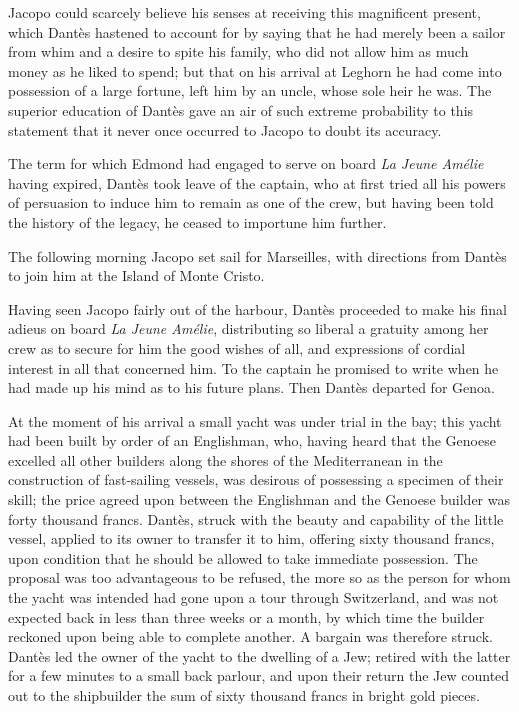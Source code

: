  Jacopo could scarcely believe his senses at receiving this magnificent present, which Dantès hastened to account for by saying that he had merely been a sailor from whim and a desire to spite his family, who did not allow him as much money as he liked to spend; but that on his arrival at Leghorn he had come into possession of a large fortune, left him by an uncle, whose sole heir he was. The superior education of Dantès gave an air of such extreme probability to this statement that it never once occurred to Jacopo to doubt its accuracy. 

 The term for which Edmond had engaged to serve on board \textit{La Jeune Amélie} having expired, Dantès took leave of the captain, who at first tried all his powers of persuasion to induce him to remain as one of the crew, but having been told the history of the legacy, he ceased to importune him further. 

 The following morning Jacopo set sail for Marseilles, with directions from Dantès to join him at the Island of Monte Cristo. 

 Having seen Jacopo fairly out of the harbour, Dantès proceeded to make his final adieus on board \textit{La Jeune Amélie}, distributing so liberal a gratuity among her crew as to secure for him the good wishes of all, and expressions of cordial interest in all that concerned him. To the captain he promised to write when he had made up his mind as to his future plans. Then Dantès departed for Genoa. 

 At the moment of his arrival a small yacht was under trial in the bay; this yacht had been built by order of an Englishman, who, having heard that the Genoese excelled all other builders along the shores of the Mediterranean in the construction of fast-sailing vessels, was desirous of possessing a specimen of their skill; the price agreed upon between the Englishman and the Genoese builder was forty thousand francs. Dantès, struck with the beauty and capability of the little vessel, applied to its owner to transfer it to him, offering sixty thousand francs, upon condition that he should be allowed to take immediate possession. The proposal was too advantageous to be refused, the more so as the person for whom the yacht was intended had gone upon a tour through Switzerland, and was not expected back in less than three weeks or a month, by which time the builder reckoned upon being able to complete another. A bargain was therefore struck. Dantès led the owner of the yacht to the dwelling of a Jew; retired with the latter for a few minutes to a small back parlour, and upon their return the Jew counted out to the shipbuilder the sum of sixty thousand francs in bright gold pieces. 


